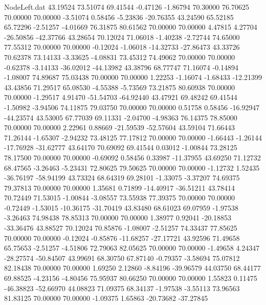\begin{filecontents}{NodeLeft.dat}
  43.19524   73.51074   69.41544    -0.47126   -1.86794   70.30000   76.70625   70.00000   70.00000   -3.51074    0.58456   -5.23836  -20.76355
  43.24590   65.52185   65.72296    -2.51257   -4.01669   76.31875   80.61562   70.00000   70.00000    4.47815    4.27704  -26.50856  -42.37766
  43.28654   70.12024   71.06018    -1.40238   -2.72744   74.65000   77.55312   70.00000   70.00000   -0.12024   -1.06018  -14.32733  -27.86473
  43.33726   70.62378   73.14133    -3.33625   -4.08831   73.45312   74.49062   70.00000   70.00000   -0.62378   -3.14133  -36.02012  -44.13982
  43.38796   68.77747   71.16074    -0.14894   -1.08007   74.89687   75.03438   70.00000   70.00000    1.22253   -1.16074   -1.68433  -12.21399
  43.43856   71.29517   65.08530    -4.55388   -5.73569   73.21875   80.60938   70.00000   70.00000   -1.29517    4.91470  -51.54703  -64.92440
  43.47921   69.48242   69.41544    -1.50982   -3.94506   74.11875   79.03750   70.00000   70.00000    0.51758    0.58456  -16.92947  -44.23574
  43.53005   67.77039   69.11331    -2.04700   -4.98363   76.14375   78.85000   70.00000   70.00000    2.22961    0.88669  -21.59539  -52.57604
  43.59104   71.66443   71.26144    -1.65307   -2.94232   73.48125   77.17812   70.00000   70.00000   -1.66443   -1.26144  -17.76928  -31.62777
  43.64170   70.69092   69.41544     0.03012   -1.00844   73.28125   78.17500   70.00000   70.00000   -0.69092    0.58456    0.33987  -11.37955
  43.69250   71.12732   68.47565    -3.26463   -5.23431   72.80625   79.50625   70.00000   70.00000   -1.12732    1.52435  -36.76197  -58.94199
  43.73324   68.64319   69.28101    -1.33075   -3.37207   74.69375   79.37813   70.00000   70.00000    1.35681    0.71899  -14.40917  -36.51211
  43.78414   70.72449   71.53015    -1.00844   -3.08557   73.55938   77.39375   70.00000   70.00000   -0.72449   -1.53015  -10.36175  -31.70419
  43.83480   68.61023   69.07959    -1.97538   -3.26463   74.98438   78.85313   70.00000   70.00000    1.38977    0.92041  -20.18853  -33.36476
  43.88527   70.12024   70.85876    -1.08007   -2.51257   74.33437   77.85625   70.00000   70.00000   -0.12024   -0.85876  -11.68257  -27.17721
  43.92596   71.49658   65.75653    -2.51257   -4.51806   72.79063   82.05625   70.00000   70.00000   -1.49658    4.24347  -28.27574  -50.84507
  43.99691   68.30750   67.87140    -0.79357   -3.58694   75.07812   82.18438   70.00000   70.00000    1.69250    2.12860   -8.84196  -39.96579
  44.03750   68.44177   69.88525    -4.23156   -4.80456   75.95937   80.66250   70.00000   70.00000    1.55823    0.11475  -46.38823  -52.66970
  44.08823   71.09375   68.34137    -1.97538   -3.55113   73.96563   81.83125   70.00000   70.00000   -1.09375    1.65863  -20.73682  -37.27845

\end{filecontents}
